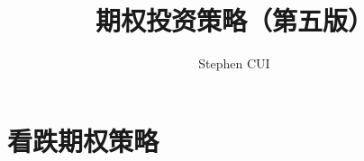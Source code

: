 \documentclass[openany]{book}
\title{期权投资策略（第五版）}
\author{Stephen CUI}
\begin{document}
\maketitle
\frontmatter
\tableofcontents
\mainmatter
% 
\part{看跌期权策略}

% 
\end{document}
